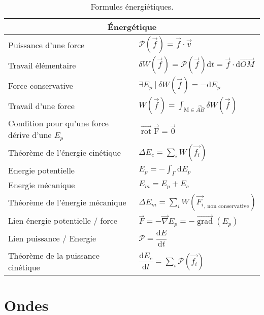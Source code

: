\documentclass[10pt,a4paper,titlepage,landscape]{article}
\renewcommand{\d}
{
    \mathrm{d}
}
\newcommand*{\dv}[2]
{
    \dfrac{\d#1}{\d#2}
}
\newcommand{\rot}
{
    \vec{\operatorname{rot}}
}
\newcommand{\grad}
{
    \vec{\operatorname{grad}}
}
\renewcommand{\arraystretch}{2}
\begin{document}
\begin{table}[H]
    \centering
    \renewcommand{\arraystretch}{1.5} %
    \setlength{\tabcolsep}{8pt} %
    \begin{tabular}{@{}|p{9cm}|p{10cm}@{}|}

        \multicolumn{2}{c}{\textbf{Énergétique}} \\ \hline

    Puissance d'une force & $\mathcal{P}(\vec{f}) = \vec{f} \cdot \vec{v}$ \\ \hline 
    Travail élémentaire & $\delta W(\vec{f}) = \mathcal{P}(\vec{f})\text{d}t=\vec{f}\cdot \text{d}\vec{OM}$ \\ \hline 
    Force conservative & $\exists E_{p} \ | \ \delta W(\vec{f}) = -\text{d}E_{p}$ \\ \hline 
    Travail d'une force & $\displaystyle W(\vec{f}) = \int_{\text{M}\in\overset{\curvearrowright}{AB}}\delta W(\vec{f})$ \\ \hline 
    Condition pour qu'une force dérive d'une $E_p$ & $\rot{\vec{\text{F}}} = \vec{0}$ \\ \hline 
    Théorème de l'énergie cinétique & $\displaystyle \Delta E_c = \sum\limits_{i}W(\vec{f_i})$ \\ \hline 
    Energie potentielle & $\displaystyle E_p = -\int_{\Gamma}\text{d}E_p$ \\ \hline 
    Energie mécanique & $E_m = E_p + E_c$ \\ \hline 
    Théorème de l'énergie mécanique & $\displaystyle \Delta E_m = \sum_{i}W(\vec{F_i}_{\text{, non conservative}})$ \\ \hline 
    Lien énergie potentielle / force & $\vec{F} = -\vec{\nabla} E_p = -\grad(E_p)$ \\ \hline 
    Lien puissance / Energie & $\mathcal{P} = \dv{E}{t}$ \\ \hline 
    Théorème de la puissance cinétique & $\displaystyle \dv{E_c}{t} = \sum_{i}\mathcal{P}(\vec{f_i})$ \\ \hline 
    \end{tabular}
\caption{Formules énergiétiques.}
\label{tab:energetique}
\end{table}


\section{Ondes}
\end{document}
